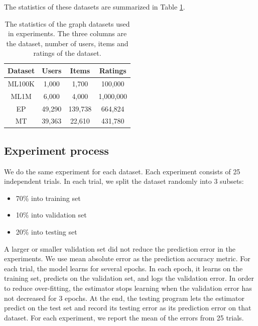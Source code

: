 \documentclass[12pt]{WSUThesis}
\theoremstyle{definition}
\begin{document}
The statistics of these datasets are summarized in Table \ref{tab:datasets-recommendation}.
\begin{table}[!ht]\centering
	\caption{
		The statistics of the graph datasets used in experiments.
		The three columns are the dataset, number of users, items and ratings 
		of the dataset.
	}
	\begin{tabular}{cccc}  \hline
		Dataset & Users   & Items   & Ratings \\ \hline
		ML100K  & 1,000   & 1,700   & 100,000 \\ \hline
		ML1M    & 6,000   & 4,000   & 1,000,000 \\ \hline
		EP      & 49,290  & 139,738 & 664,824 \\ \hline
		MT      & 39,363  & 22,610  & 431,780 \\ \hline
	\end{tabular}
	\label{tab:datasets-recommendation}
\end{table}

\subsection{Experiment process}
We do the same experiment for each dataset.
Each experiment consists of 25 independent trials.
In each trial, we split the dataset randomly into 3 subsets:
\begin{itemize}
	\item 70\% into training set
	\item 10\% into validation set
	\item 20\% into testing set
\end{itemize}
A larger or smaller validation set did not reduce the prediction error in the 
experiments.
We use mean absolute error as the prediction accuracy metric.
For each trial, the model learns for several epochs.
In each epoch,
it learns on the training set,
predicts on the validation set,
and logs the validation error.
In order to reduce over-fitting,
the estimator stops learning when the validation error has not decreased for 3 
epochs.
At the end, the testing program lets the estimator predict on the test set 
and record its testing error as its prediction error on that dataset.
For each experiment, we report the mean of the errors from 25 trials.
\end{document}
